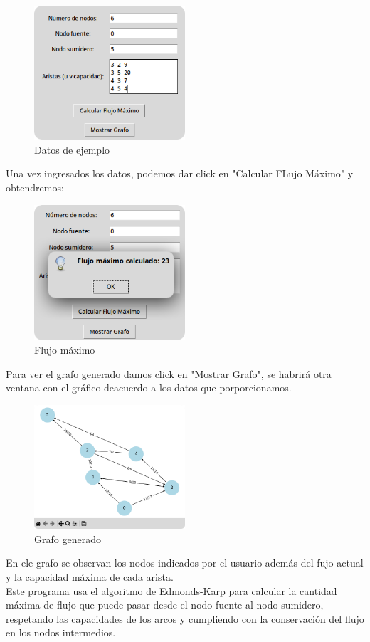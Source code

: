 \documentclass[a4paper]{article}
\begin{document}
\begin{figure}[h]
    \centering
    \includegraphics[width=0.5\textwidth]{2.png}
    \caption{Datos de ejemplo}
\end{figure}
\newpage
Una vez ingresados los datos, podemos dar click en "Calcular FLujo Máximo" y obtendremos:

\begin{figure}[H]
    \centering
    \includegraphics[width=0.5\textwidth]{3.png}
    \caption{Flujo máximo}
\end{figure}
Para ver el grafo generado damos click en "Mostrar Grafo", se habrirá otra ventana con el gráfico deacuerdo a los datos que porporcionamos.

\begin{figure}[h]
    \centering
    \includegraphics[width=0.5\textwidth]{4.png}
    \caption{Grafo generado}
\end{figure}

En ele grafo se observan los nodos indicados por el usuario además del fujo actual y la capacidad máxima de cada arista.\\
Este programa usa el algoritmo de Edmonds-Karp para calcular la cantidad máxima de flujo que puede pasar desde el nodo fuente al nodo sumidero, respetando las capacidades de los arcos y cumpliendo con la conservación del flujo en los nodos intermedios.
\end{document}
